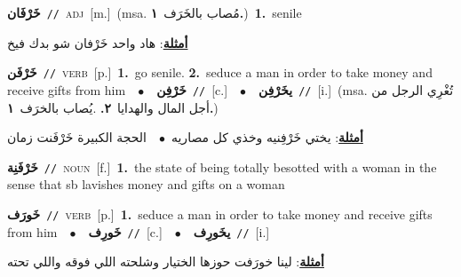 \documentclass[10pt,a4paper,twoside]{article} %
\begin{document}
\begin{multicols}{2}
{\setlength\topsep{0pt}\textbf{\foreignlanguage{arabic}{خَرْفَان}}\ {\color{gray}\texttt{//}\color{black}}\ \textsc{adj}\ [m.]\ \color{gray}(msa. \foreignlanguage{arabic}{مُصاب بالخَرَف}~\foreignlanguage{arabic}{\textbf{١.}})\color{black}\ \textbf{1.}~senile\  \begin{flushright}\color{gray}\foreignlanguage{arabic}{\textbf{\underline{\foreignlanguage{arabic}{أمثلة}}}: هاد واحد خَرْفان شو بدك فيخ}\end{flushright}\color{black}} \vspace{2mm}

{\setlength\topsep{0pt}\textbf{\foreignlanguage{arabic}{خَرْفَن}}\ {\color{gray}\texttt{//}\color{black}}\ \textsc{verb}\ [p.]\ \textbf{1.}~go senile.  \textbf{2.}~seduce a man in order to take money and receive gifts from him\ \ $\bullet$\ \ \setlength\topsep{0pt}\textbf{\foreignlanguage{arabic}{خَرْفِن}}\ {\color{gray}\texttt{//}\color{black}}\ [c.]\ \ $\bullet$\ \ \setlength\topsep{0pt}\textbf{\foreignlanguage{arabic}{يخَرْفِن}}\ {\color{gray}\texttt{//}\color{black}}\ [i.]\ \color{gray}(msa. \foreignlanguage{arabic}{تُغْرِي الرجل من أجل المال والهدايا}~\foreignlanguage{arabic}{\textbf{٢.}}  .\foreignlanguage{arabic}{يُصاب بالخرَف}~\foreignlanguage{arabic}{\textbf{١.}})\color{black}\  \begin{flushright}\color{gray}\foreignlanguage{arabic}{\textbf{\underline{\foreignlanguage{arabic}{أمثلة}}}: يختي خَرْفِنيه وخذي كل مصاريه\ $\bullet$\ \  الحجة الكبيرة خَرْفَنت زمان}\end{flushright}\color{black}} \vspace{2mm}

{\setlength\topsep{0pt}\textbf{\foreignlanguage{arabic}{خَرْفَنِة}}\ {\color{gray}\texttt{//}\color{black}}\ \textsc{noun}\ [f.]\ \textbf{1.}~the state of being totally besotted with a woman in the sense that sb lavishes money and gifts on a woman\ } \vspace{2mm}

{\setlength\topsep{0pt}\textbf{\foreignlanguage{arabic}{خَورَف}}\ {\color{gray}\texttt{//}\color{black}}\ \textsc{verb}\ [p.]\ \textbf{1.}~seduce a man in order to take money and receive gifts from him\ \ $\bullet$\ \ \setlength\topsep{0pt}\textbf{\foreignlanguage{arabic}{خَورِف}}\ {\color{gray}\texttt{//}\color{black}}\ [c.]\ \ $\bullet$\ \ \setlength\topsep{0pt}\textbf{\foreignlanguage{arabic}{يخَورِف}}\ {\color{gray}\texttt{//}\color{black}}\ [i.]\  \begin{flushright}\color{gray}\foreignlanguage{arabic}{\textbf{\underline{\foreignlanguage{arabic}{أمثلة}}}: لينا خورَفت حوزها الختيار وشلحته اللي فوقه واللي تحته}\end{flushright}\color{black}} \vspace{2mm}


\end{multicols}
\end{document}
